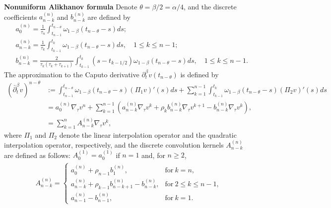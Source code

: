 \documentclass[11pt]{article}
\numberwithin{equation}{section}
\begin{document}
\textbf{Nonuniform Alikhanov formula} 
Denote $\theta=\beta/2=\alpha/4$, and the discrete coefficients $a_{n-k}^{(n)}$ and $b_{n-k}^{(n)}$ are defined by
\begin{align*}
&a_{0}^{(n)}=\frac{1}{\tau_n}\int_{t_{n-1}}^{t_{n-\theta}}
\omega_{1-\beta}(t_{n-\theta}-s)ds;\\
&a_{n-k}^{(n)}=\frac{1}{\tau_k}\int_{t_{k-1}}^{t_k}
\omega_{1-\beta}(t_{n-\theta}-s)ds,\quad 1\leq k\leq n-1;\\
&b_{n-k}^{(n)}=\frac{2}{\tau_k(\tau_k+\tau_{k+1})}
\int_{t_{k-1}}^{t_k}(s-t_{k-1/2})
\omega_{1-\beta}(t_{n-\theta}-s)ds,\quad 1\leq k\leq n-1.
\end{align*}
The approximation to
the Caputo derivative $\partial_t^\beta v(t_{n-\theta})$ is defined by
\begin{align}\nonumber
(\bar\partial_t^\beta v)^{n-\theta}
&:=\int_{t_{n-1}}^{t_{n-\theta}}\omega_{1-\beta}(t_{n-\theta}-s)(\Pi_{1}v)'(s)ds
+\sum\limits_{k=1}^{n-1}\int_{t_{k-1}}^{t_{k}}\omega_{1-\beta}(t_{n-\theta}-s)
(\Pi_{2}v)'(s)ds\\\nonumber
&=a_0^{(n)}\nabla_\tau v^n+\sum\limits_{k=1}^{n-1}(a_{n-k}^{(n)}\nabla_\tau v^k+\rho_kb_{n-k}^{(n)}\nabla_\tau v^{k+1}-b_{n-k}^{(n)}\nabla_\tau v^k),\\\label{L2-1}
&=\sum\limits_{k=1}^{n}A_{n-k}^{(n)}\nabla_{\tau}v^k,
\end{align}
where $\Pi_{1}$ and $\Pi_{2}$ denote the linear interpolation operator and the quadratic interpolation operator, respectively, and the discrete convolution kernels $A_{n-k}^{(n)}$ are defined as follows: $A_0^{(1)}=a_0^{(1)}$ if $n=1$ and, for $n\geq2$,
\begin{align}\label{b-4}
\begin{array}{c}
A_{n-k}^{(n)}=\left\{
\begin{array}{ll}
a_0^{(n)}+\rho_{n-1}b_1^{(n)},&\mbox{for}~k=n,\\
a_{n-k}^{(n)}+\rho_{k-1}b_{n-k+1}^{(n)}-b_{n-k}^{(n)},
&\mbox{for}~ 2\leq k\leq n-1,\\
a_{n-1}^{(n)}-b_{n-1}^{(n)},&\mbox{for}~ k=1.
\end{array}\right.
\end{array}
\end{align} 

\end{document}
